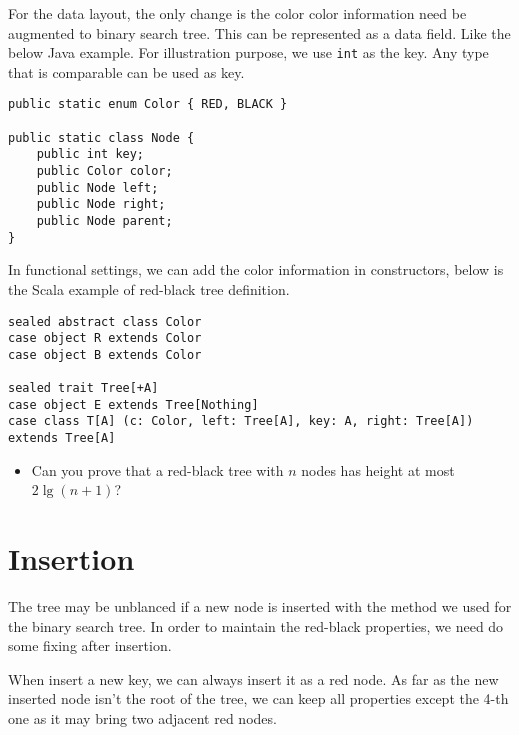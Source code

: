 \documentclass{article}
\begin{document}
For the data layout, the only change is the color
color information need be augmented to binary search tree.
This can be represented as a data field. Like the below Java example.
For illustration purpose, we use \texttt{int} as the key. Any
type that is comparable can be used as key.

\lstset{language=Java}
\begin{lstlisting}
public static enum Color { RED, BLACK }

public static class Node {
    public int key;
    public Color color;
    public Node left;
    public Node right;
    public Node parent;
}
\end{lstlisting}

In functional settings, we can add the color information
in constructors, below is the Scala example of red-black tree
definition.

\lstset{language=Scala}
\begin{lstlisting}
sealed abstract class Color
case object R extends Color
case object B extends Color

sealed trait Tree[+A]
case object E extends Tree[Nothing]
case class T[A] (c: Color, left: Tree[A], key: A, right: Tree[A]) extends Tree[A]
\end{lstlisting}

\begin{Exercise}

\begin{itemize}
\item Can you prove that a red-black tree with $n$ nodes has
height at most $2 \lg (n+1)$?
\end{itemize}

\end{Exercise}

\section{Insertion}

The tree may be unblanced if a new node is inserted with the method we
used for the binary search tree. In order to maintain the red-black properties,
we need do some fixing after insertion.

When insert a new key, we can always insert it as a
red node. As far as the new inserted node isn't the root of the tree,
we can keep all properties except the 4-th one as it may bring two
adjacent red nodes.
\end{document}
